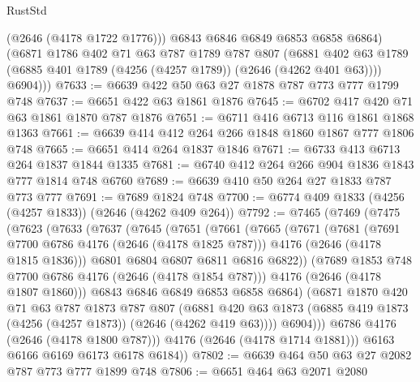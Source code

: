 \begin{lexlean}{RustStd}
\begin{coremodule}
            (@2646 (@4178 @1722 @1776)))
          @6843
          @6846
          @6849
          @6853
          @6858
          @6864)
        (@6871
          @1786
          @402
          @71
          @63
          @787
          @1789
          @787
          @807
          (@6881 @402 @63 @1789 (@6885 @401 @1789 (@4256 (@4257 @1789)) (@2646 (@4262 @401 @63))))
          @6904)))
@7633 := @6639 @422 @50 @63 @27 @1878 @787 @773 @777 @1799 @748
@7637 := @6651 @422 @63 @1861 @1876
@7645 := @6702 @417 @420 @71 @63 @1861 @1870 @787 @1876
@7651 := @6711 @416 @6713 @116 @1861 @1868 @1363
@7661 := @6639 @414 @412 @264 @266 @1848 @1860 @1867 @777 @1806 @748
@7665 := @6651 @414 @264 @1837 @1846
@7671 := @6733 @413 @6713 @264 @1837 @1844 @1335
@7681 := @6740 @412 @264 @266 @904 @1836 @1843 @777 @1814 @748 @6760
@7689 := @6639 @410 @50 @264 @27 @1833 @787 @773 @777
@7691 := @7689 @1824 @748
@7700 := @6774 @409 @1833 (@4256 (@4257 @1833)) (@2646 (@4262 @409 @264))
@7792 := @7465
    (@7469
      (@7475
        (@7623
          (@7633
            (@7637
              (@7645
                (@7651
                  (@7661
                    (@7665
                      (@7671
                        (@7681
                          (@7691 @7700 @6786 @4176 (@2646 (@4178 @1825 @787)))
                          @4176
                          (@2646 (@4178 @1815 @1836)))
                        @6801
                        @6804
                        @6807
                        @6811
                        @6816
                        @6822))
                    (@7689 @1853 @748 @7700 @6786 @4176 (@2646 (@4178 @1854 @787)))
                    @4176
                    (@2646 (@4178 @1807 @1860)))
                  @6843
                  @6846
                  @6849
                  @6853
                  @6858
                  @6864)
                (@6871
                  @1870
                  @420
                  @71
                  @63
                  @787
                  @1873
                  @787
                  @807
                  (@6881
                    @420
                    @63
                    @1873
                    (@6885 @419 @1873 (@4256 (@4257 @1873)) (@2646 (@4262 @419 @63))))
                  @6904)))
            @6786
            @4176
            (@2646 (@4178 @1800 @787)))
          @4176
          (@2646 (@4178 @1714 @1881)))
        @6163
        @6166
        @6169
        @6173
        @6178
        @6184))
@7802 := @6639 @464 @50 @63 @27 @2082 @787 @773 @777 @1899 @748
@7806 := @6651 @464 @63 @2071 @2080

\end{coremodule}
\end{lexlean}
